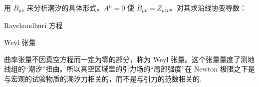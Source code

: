 

用 $B_{\mu\nu}$ 来分析潮汐的具体形式。$A^\mu=0$ 使 $B_{\mu\nu}=Z_{\mu;\nu}$。对其求沿线协变导数：

Raychaudhuri 方程

Weyl 张量

曲率张量不因真空方程而一定为零的部分，称为 Weyl 张量。这个张量量度了测地线组的“潮汐”扭曲。所以真空区域里的引力场的“局部强度”在 Newton 极限之下是与宏观的试验物质的潮汐力相关的，而不是与引力的范数相关的.